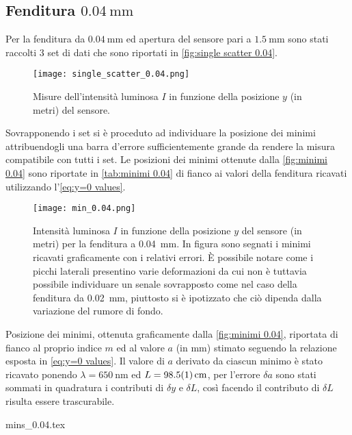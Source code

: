 \documentclass[../main.tex]{subfiles}
\begin{document}
\subsection{Fenditura $\qty{0.04}{\mm}$}

Per la fenditura da $\qty{0.04}{\mm}$ ed apertura del sensore pari a $\qty{1.5}{\mm}$ sono stati raccolti $3$ set di dati che sono riportati in \autoref{fig:single scatter 0.04}.

\begin{figure}[ht!]
    \centering
    \texttt{[image: single\_scatter\_0.04.png]}
    \caption{Misure dell'intensità luminosa $I$ in funzione della posizione $y$ (in metri) del sensore.} %
    \label{fig:single scatter 0.04}
\end{figure}

Sovrapponendo i set si è proceduto ad individuare la posizione dei minimi attribuendogli una barra d'errore sufficientemente grande da rendere la misura compatibile con tutti i set. Le posizioni dei minimi ottenute dalla \autoref{fig:minimi 0.04} sono riportate in \autoref{tab:minimi 0.04} di fianco ai valori della fenditura ricavati utilizzando l'\autoref{eq:y=0 values}.

\begin{figure}[ht!]
    \centering
    \texttt{[image: min\_0.04.png]}
    \caption{Intensità luminosa $I$ in funzione della posizione $y$ del sensore (in metri) per la fenditura a \qty{0.04}{\mm}. In figura sono segnati i minimi ricavati graficamente con i relativi errori. È possibile notare come i picchi laterali presentino varie deformazioni da cui non è tuttavia possibile individuare un senale sovrapposto come nel caso della fenditura da \qty{0.02}{\mm}, piuttosto si è ipotizzato che ciò dipenda dalla variazione del rumore di fondo. %
    } %
    \label{fig:minimi 0.04}
\end{figure}

\begin{table}[ht!]
    \centering
    \caption{Posizione dei minimi, ottenuta graficamente dalla \autoref{fig:minimi 0.04}, riportata di fianco al proprio indice $m$ ed al valore $a$ (in $\si{\mm}$) stimato seguendo la relazione esposta in \autoref{eq:y=0 values}. Il valore di $a$ derivato da ciascun minimo è stato ricavato ponendo $\lambda = \qty{650}{\nm}$ ed $L = \qty{98.5+-0.1}{\cm}$, per l'errore $\delta a$ sono stati sommati in quadratura i contributi di $\delta y$ e $\delta L$, così facendo il contributo di $\delta L$ risulta essere trascurabile.}
    {mins_0.04.tex}
    \label{tab:minimi 0.04}
\end{table}
\end{document}
